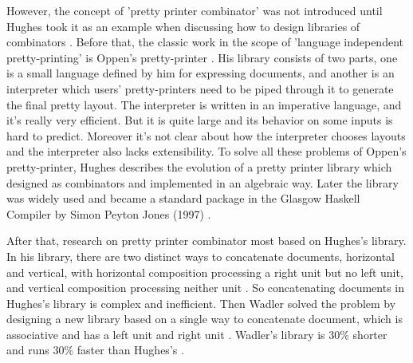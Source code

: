 However, the concept of 'pretty printer combinator' was not introduced until Hughes took it as an example when discussing how to design libraries of combinators \cite{hughes1995design}. Before that, the classic work in the scope of 'language independent pretty-printing' is Oppen's pretty-printer \cite{oppen1980prettyprinting}. His library consists of two parts, one is a small language defined by him for expressing documents, and another is an interpreter which users' pretty-printers need to be piped through it to generate the final pretty layout. The interpreter is written in an imperative language, and it's really very efficient. But it is quite large and its behavior on some inputs is hard to predict. Moreover it's not clear about how the interpreter chooses layouts and the interpreter also lacks extensibility. To solve all these problems of Oppen's pretty-printer, Hughes describes the evolution of a pretty printer library which designed as combinators and implemented in an algebraic way. Later the library was widely used and became a standard package in the Glasgow Haskell Compiler by Simon Peyton Jones (1997) \cite{jones1993glasgow}.

After that, research on pretty printer combinator most based on Hughes's library. In his library, there are two distinct ways to concatenate documents, horizontal and vertical, with horizontal composition processing a right unit but no left unit, and vertical composition processing neither unit \cite{wadler2003prettier}. So concatenating documents in Hughes's library is complex and inefficient. Then Wadler solved the problem by designing a new library based on a single way to concatenate document, which is associative and has a left unit and right unit \cite{wadler2003prettier}. Wadler's library is 30\% shorter and runs 30\% faster than Hughes's \cite{wadler2003prettier}.





